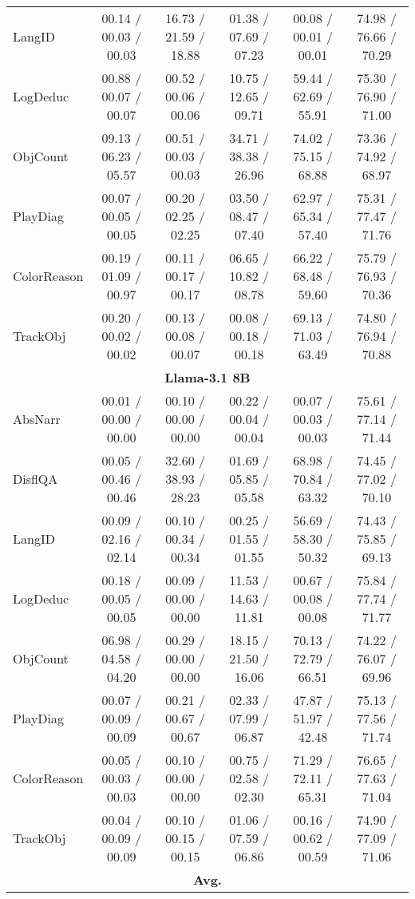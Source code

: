 \begin{table*}[tb]
{\begin{tabular}{lccccc}
    LangID
& 00.14 / 00.03 / 00.03& 16.73 / 21.59 / 18.88& 01.38 / 07.69 / 07.23& 00.08 / 00.01 / 00.01& 74.98 / 76.66 / 70.29
\\
    LogDeduc
& 00.88 / 00.07 / 00.07& 00.52 / 00.06 / 00.06& 10.75 / 12.65 / 09.71& 59.44 / 62.69 / 55.91& 75.30 / 76.90 / 71.00
\\
    ObjCount
& 09.13 / 06.23 / 05.57& 00.51 / 00.03 / 00.03& 34.71 / 38.38 / 26.96& 74.02 / 75.15 / 68.88& 73.36 / 74.92 / 68.97
\\
    PlayDiag
& 00.07 / 00.05 / 00.05& 00.20 / 02.25 / 02.25& 03.50 / 08.47 / 07.40& 62.97 / 65.34 / 57.40& 75.31 / 77.47 / 71.76
\\
    ColorReason
& 00.19 / 01.09 / 00.97& 00.11 / 00.17 / 00.17& 06.65 / 10.82 / 08.78& 66.22 / 68.48 / 59.60& 75.79 / 76.93 / 70.36
\\
    TrackObj& 00.20 / 00.02 / 00.02& 00.13 / 00.08 / 00.07& 00.08 / 00.18 / 00.18& 69.13 / 71.03 / 63.49& 74.80 / 76.94 / 70.88\\
    \bottomrule
    \multicolumn{6}{c}{\textbf{Llama-3.1 8B}} \\
    AbsNarr
& 00.01 / 00.00 / 00.00& 00.10 / 00.00 / 00.00& 00.22 / 00.04 / 00.04
& 00.07 / 00.03 / 00.03
& 75.61 / 77.14 / 71.44
\\
    DisflQA
& 00.05 / 00.46 / 00.46& 32.60 / 38.93 / 28.23& 01.69 / 05.85 / 05.58
& 68.98 / 70.84 / 63.32
& 74.45 / 77.02 / 70.10
\\
    LangID
& 00.09 / 02.16 / 02.14& 00.10 / 00.34 / 00.34& 00.25 / 01.55 / 01.55
& 56.69 / 58.30 / 50.32
& 74.43 / 75.85 / 69.13
\\
    LogDeduc
& 00.18 / 00.05 / 00.05& 00.09 / 00.00 / 00.00& 11.53 / 14.63 / 11.81
& 00.67 / 00.08 / 00.08
& 75.84 / 77.74 / 71.77
\\
    ObjCount
& 06.98 / 04.58 / 04.20& 00.29 / 00.00 / 00.00& 18.15 / 21.50 / 16.06
& 70.13 / 72.79 / 66.51
& 74.22 / 76.07 / 69.96
\\
    PlayDiag
& 00.07 / 00.09 / 00.09& 00.21 / 00.67 / 00.67& 02.33 / 07.99 / 06.87
& 47.87 / 51.97 / 42.48
& 75.13 / 77.56 / 71.74
\\
    ColorReason
& 00.05 / 00.03 / 00.03& 00.10 / 00.00 / 00.00& 00.75 / 02.58 / 02.30
& 71.29 / 72.11 / 65.31
& 76.65 / 77.63 / 71.04
\\
    TrackObj& 00.04 / 00.09 / 00.09& 00.10 / 00.15 / 00.15& 01.06 / 07.59 / 06.86& 00.16 / 00.62 / 00.59& 74.90 / 77.09 / 71.06\\
    \bottomrule
    \multicolumn{6}{c}{\textbf{Avg.}} \\

\end{tabular}}
\end{table*}

